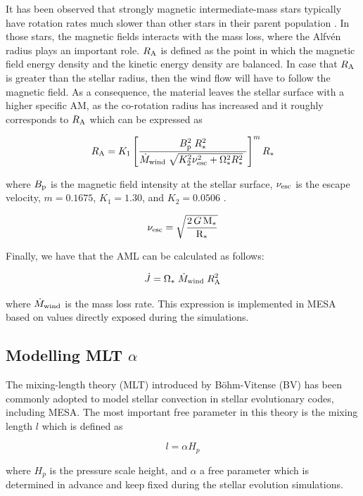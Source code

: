 \documentclass[fleqn,usenatbib]{mnras}
\begin{document}
It has been observed that strongly magnetic intermediate-mass stars typically have rotation rates much slower than other stars in their parent population \citep{Mathys2006}. In those stars, the magnetic fields interacts with the mass loss, where the Alfv\'{e}n radius plays an important role. $R_{\mathrm{A}}$ is defined as the point in which the magnetic field energy density and the kinetic energy density are balanced. In case that $R_{\mathrm{A}}$ is greater than the stellar radius, then the wind flow will have to follow the magnetic field. As a consequence, the material leaves the stellar surface with a higher specific AM, as the co-rotation radius has increased and it roughly corresponds to $R_{\mathrm{A}}$ which can be expressed as \citep{Matt2012}
\begin{ceqn}
\begin{equation}
    R_{\mathrm{A}} = K_1\left[\frac{B_{\mathrm{p}}^{2}\;R_*^{2}}{\Dot{M}_{\mathrm{wind}}\;\sqrt{K_2^2\nu_{\mathrm{esc}}^2 + \Omega_*^2R_*^{2}}\ }\right]^{m}R_*  \label{eq:mb_ralfven}
\end{equation}
\end{ceqn}
where $B_{\mathrm{p}}$ is the magnetic field intensity at the stellar surface, $\nu_{\mathrm{esc}}$ is the escape velocity, $m = 0.1675$, $K_1 = 1.30$, and $K_2 = 0.0506$ \citep{Gallet2013}.
\begin{ceqn}
\begin{equation}
\nu_{\mathrm{esc}} = \sqrt{\frac{2\,G\,\mathrm{M}_*}{\mathrm{R}_*}} \label{eq:vesc}
\end{equation}
\end{ceqn}

Finally, we have that the AML can be calculated as follows:
\begin{ceqn}
\begin{equation}
 \Dot{J} = \Omega_* \; \Dot{M}_{\mathrm{wind}} \; R_{\mathrm{A}}^{2} \label{eq:j_dot}
\end{equation}
\end{ceqn}
where $\Dot{M}_{\mathrm{wind}}$ is the mass loss rate. This expression is implemented in MESA based on values directly exposed during the simulations.

\subsection{Modelling MLT $\alpha$} \label{mod_mltalpha}
The mixing-length theory (MLT) introduced by Böhm-Vitense (BV) has been commonly adopted to model stellar convection in stellar evolutionary codes, including MESA. The most important free parameter in this theory is the mixing length $l$ which is defined as 
\begin{ceqn}
\begin{equation}
 l = \alpha H_p\label{eq:mixlength}
\end{equation}
\end{ceqn}
where $H_p$ is the pressure scale height, and $\alpha$ a free parameter which is determined in advance and keep fixed during the stellar evolution simulations.\par
\end{document}
